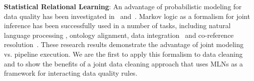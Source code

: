 \textbf{Statistical Relational Learning}: An advantage of probabilistic modeling for data quality has been investigated in~\cite{doi:10.1080/01621459.1972.10481323} and~\cite{chen2011usher}. Markov logic as a formalism for joint inference has been successfully used in a number of tasks, including natural language processing \cite{che2010jointly, riedel08collective, meza09jointly}, ontology alignment, data integration~\cite{niepert2011probabilistic} and co-reference resolution~\cite{poon2008joint,singla2006entity}. These research results demonstrate the advantage of joint modeling vs. pipeline execution. We are the first to apply this formalism to data cleaning and to show the benefits of a joint data cleaning approach that uses MLNs as a framework for interacting data quality rules. 

